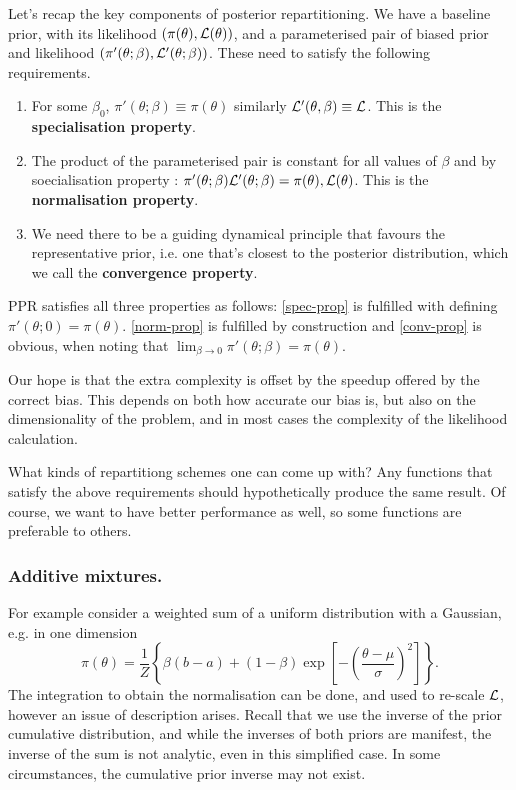 \documentclass[usenatbib]{mnras}
\begin{document}
Let's recap the key components of posterior repartitioning. We have
   a baseline prior, with its likelihood \((\pi(\theta), \cal L
      (\theta))\), and a parameterised pair of biased prior and
   likelihood \((\pi'(\theta; \beta), \cal L' (\theta;
      \beta))\). These need to satisfy the following requirements.

\begin{enumerate}
\item For some \(\beta_{0}\), \(\pi'(\theta; \beta) \equiv \pi(\theta)\)
similarly \({\cal L'(\theta, \beta) \equiv {\cal L}}\). This is
the \textbf{\textbf{specialisation property}}.\label{spec-prop}
\item The product of the parameterised pair is constant for all values
of \(\beta\) and by soecialisation property : \(\pi'(\theta; \beta)
      \cal L' (\theta; \beta) = \pi(\theta), \cal L (\theta)\). This is
the \textbf{\textbf{normalisation property}}.\label{norm-prop}
\item We need there to be a guiding dynamical principle that favours
the representative prior, i.e. one that's closest to the
posterior distribution, which we call the \textbf{\textbf{convergence
property}}.\label{conv-prop}
\end{enumerate}

PPR satisfies all three properties as follows: \ref{spec-prop} is
fulfilled with defining \(\pi'(\theta; 0) =
   \pi(\theta)\). \ref{norm-prop} is fulfilled by construction and
\ref{conv-prop} is obvious, when noting that \(\lim_{\beta
   \rightarrow 0} \pi'(\theta; \beta) = \pi(\theta)\).

Our hope is that the extra complexity is offset by the speedup
offered by the correct bias. This depends on both how accurate our
bias is, but also on the dimensionality of the problem, and in most
cases the complexity of the likelihood calculation. 

What kinds of repartitiong schemes one can come up with? Any
functions that satisfy the above requirements should hypothetically
produce the same result. Of course, we want to have better
performance as well, so some functions are preferable to others. 

\subsubsection{Additive mixtures.}
\label{sec:org3d52ccf}
For example consider a weighted sum of a uniform distribution with
a Gaussian, e.g. in one dimension
\begin{equation}
  \pi(\theta) = \frac{1}{Z} \left\lbrace \beta (b - a) + (1-\beta) \exp \left[ -\left(\frac{\theta - \mu}{\sigma} \right)^{2}\right]\right\rbrace.
\end{equation}
The integration to obtain the normalisation can be done, and used
to re-scale \({\cal L}\), however an issue of description
arises. Recall that we use the inverse of the prior cumulative
distribution, and while the inverses of both priors are manifest,
the inverse of the sum is not analytic, even in this simplified
case. In some circumstances, the cumulative prior inverse may not
exist. 
\end{document}
